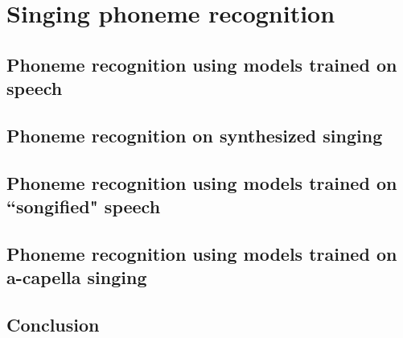 \chapter{Singing phoneme recognition} \label{chap:phonerec}
\section{Phoneme recognition using models trained on speech}
\section{Phoneme recognition on synthesized singing}
\section{Phoneme recognition using models trained on ``songified" speech}
\section{Phoneme recognition using models trained on a-capella singing} \label{sec:phonerec_acap}
\section{Conclusion}

